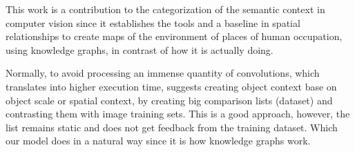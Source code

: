 
This work is a contribution to the categorization of the semantic context in 
computer vision since it establishes the tools and a baseline in spatial 
relationships to create maps of the environment of places of human occupation, 
using knowledge graphs, in contrast of how it is actually doing.

Normally, to avoid processing an immense quantity of convolutions, which 
translates into higher execution time, \cite{Galleguillos} suggests creating 
object context base on object scale or spatial context, by creating big 
comparison lists (dataset) and contrasting them with image training sets. 
This is a good approach, however, the list remains static and does not get 
feedback from the training dataset. Which our model does in a natural way since 
it is how knowledge graphs work.